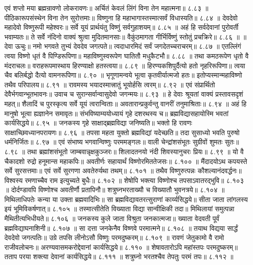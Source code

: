 एवं शप्तो मया ब्रह्मन्रावणो लोकरावणः॥
अर्चितं केवलं लिंगं विना तेन महात्मना॥ ८.८३ ॥
पीठिकारूपसंस्थेन विना तेन सुरोत्तमाः॥
विष्णुना हि महाभागास्तस्मात्सर्वं विधास्यति॥ ८.८४ ॥
देवदेवो महादेवो विष्णुरूपी महेश्वरः॥
सर्वे यूयं प्रार्थयंतु विष्णुं सर्वगुहाशयम्॥ ८.८५ ॥
अहं हि सर्वदेवानां पुरोवर्ती भवाम्यतः॥
ते सर्वे नंदिनो वाक्यं श्रुत्वा मुदितमानसाः॥
वैकुंठमागता गीर्भिर्विष्णुं स्तोतुं प्रचक्रिरे॥ ८.८६ ॥
॥ देवा ऊचुः॥
नमो भगवते तुभ्यं देवदेव जगत्पते॥
त्वदाधारमिदं सर्वं जगदेतच्चराचरम्॥ ८.८७ ॥
एतल्लिंगं त्वया विष्णो धृतं वै पिण्डिरूपिणा॥
महाविष्णुस्वरूपेण घातितौ मधुकैटभौ॥ ८.८८ ॥
तथा कमठरूपेण धृतो वै मंदराचलः॥
वराहरूपमास्थाय हिरण्याक्षो हतस्त्वया॥ ८.८९ ॥
हिरण्यकशिपुर्दैत्यो हतो नृहरिरूपिणा॥
त्वया चैव बलिर्बद्धो दैत्यो वामनरूपिणा॥ ८.९० ॥
भृगूणामन्वये भूत्वा कृतवीर्यात्मजो हतः॥
इतोप्यस्मान्महाविष्णो तथैव परिपालय॥ ८.९१ ॥
रावमस्य भयादस्मात्त्रातुं भूयोर्हसि त्वरम्॥ ८.९२ ॥
एवं संप्रार्थितो देवैर्भगवान्भूतभावनः॥
उवाच च सुरान्सर्वान्वासुदेवो जगन्मयः॥ ८.९३ ॥
हे देवाः श्रूयतां वाक्यं प्रस्तावसदृशं महत्॥
शैलादिं च पुरस्कृत्य सर्वे यूयं त्वरान्विताः॥
अवतारान्प्रकुर्वन्तु वानरीं तनुमाश्रिताः॥ ८.९४ ॥
अहं हि मानुषो भूत्वा ह्यज्ञानेन समावृतः॥
संभविष्याम्ययोध्यायं गृहे दशरथस्य च॥
ब्रह्मविद्यासहायोस्मि भवतां कार्यसिद्धये॥ ८.९५ ॥
जनकस्य गृहे साक्षाद्ब्रह्मविद्या जनिष्यति॥
भक्तो हि रावणः साक्षाच्छिवध्यानपरायणः॥ ८.९६ ॥
तपसा महता युक्तो ब्रह्मविद्यां यदेच्छति॥
तदा सुसाध्यो भवति पुरुषो धर्मनिर्जितः॥ ८.९७ ॥
एवं संभाष्य भगवान्विष्णुः परममङ्गलः॥
वाली चेन्द्रांशसंभूतः सुग्रीवों शुमतः सुतः॥ ८.९८ ॥
तथा ब्रह्मांशसंभूतो जाम्बवान्नृक्षकुञ्जरः॥
शिलादतनयो नंदी शिवस्यानुचरः प्रियः॥ ८.९९ ॥
यो वै चैकादशो रुद्रो हनूमान्स महाकपिः॥
अवतीर्णः सहायार्थं विष्णोरमिततेजसः॥ ८.१०० ॥
मैंदादयोऽथ कपयस्ते सर्वे सुरसत्तमाः॥
एवं सर्वे सुरगणा अवतेरुर्यथा तथम्॥ ८.१०१ ॥
तथैव विष्णुरुत्पन्नः कौशल्यानंदवर्द्धनः॥
विश्वस्य रमणाच्चैव राम इत्युच्यते बुधैः॥ ८.१०२ ॥
शेषोपि भक्त्या विष्णोश्च तपसाऽवातरद्भुवि॥ ८.१०३ ॥
दोर्दण्डावपि विष्णोश्च अवतीर्णौ प्रतापिनौ॥
शत्रुघ्नभरताख्यौ च विख्यातौ भुवनत्रये॥ ८.१०४ ॥
मिथिलाधिपतेः कन्या या उक्ता ब्रह्मवादिभिः॥
सा ब्रह्मविद्यावतरत्सुराणां कार्य्यसिद्धये॥
सीता जाता लांगलस्य इयं भूमिविकर्षणात्॥ ८.१०५ ॥
तस्मात्सीतेति विख्याता विद्या सान्वीक्षिकी तदा॥
मिथिलायां समुत्पन्ना मैथितीत्यभिधीयते॥ ८.१०६ ॥
जनकस्य कुले जाता विश्रुता जनकात्मजा॥
ख्याता वेदवती पूर्वं ब्रह्मविद्याघनाशिनी॥ ८.१०७ ॥
सा दत्ता जनकेनैव विष्णवे परमात्मने॥ ८.१०८ ॥
तयाथ विद्यया सार्द्धं देवदेवो जगत्पतिः॥
उग्रे तपसि लीनोऽसौ विष्णुः परमदुष्करम्॥ ८.१०९ ॥
रावणं जेतुकामो वै रामो राजीवलोचनः॥
अरण्यवासमकरोद्देवानां कार्यसिद्धये॥ ८.११० ॥
शेषावतारोऽपि महांस्तपः परमदुष्करम्॥
तताप परया शक्त्या देवानां कार्यसिद्धये॥ ८.१११ ॥
शत्रुघ्नो भरतश्चैव तेपतुः परमं तपः॥ ८.११२ ॥
